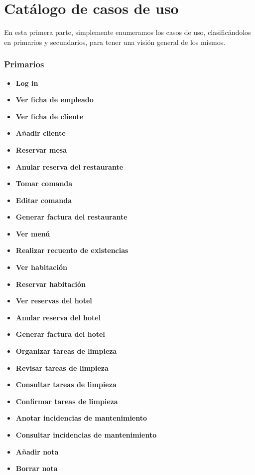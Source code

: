 \documentclass[spanish,a4paper,11pt, twoside]{report}	%
\begin{document}

\setcounter{section}{0}

\part{Catálogo de casos de uso} %
En esta primera parte, simplemente enumeramos los casos de uso, clasificándolos en primarios y secundarios, para tener una visión general de los mismos.
\section{Primarios} 				%
	\begin{itemize}
	\item \textbf{Log in}	
	\item \textbf{Ver ficha de empleado}
	\item \textbf{Ver ficha de cliente}
	\item \textbf{Añadir cliente}
	\item \textbf{Reservar mesa}
	\item \textbf{Anular reserva del restaurante}
	\item \textbf{Tomar comanda}
	\item \textbf{Editar comanda}
	\item \textbf{Generar factura del restaurante}
	\item \textbf{Ver menú}
	\item \textbf{Realizar recuento de existencias}
	\item \textbf{Ver habitación}	
	\item \textbf{Reservar habitación}
	\item \textbf{Ver reservas del hotel}
	\item \textbf{Anular reserva del hotel}
	\item \textbf{Generar factura del hotel}
	\item \textbf{Organizar tareas de limpieza}
	\item \textbf{Revisar tareas de limpieza}
	\item \textbf{Consultar tareas de limpieza}
	\item \textbf{Confirmar tareas de limpieza}
	\item \textbf{Anotar incidencias de mantenimiento}	
	\item \textbf{Consultar incidencias  de mantenimiento}
	\item \textbf{Añadir nota}
	\item \textbf{Borrar nota}
	\end{itemize}
\end{document}
